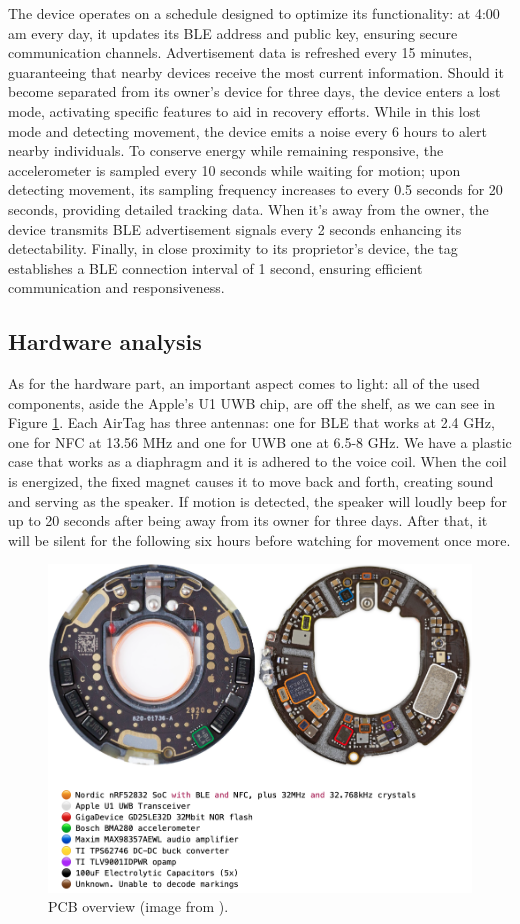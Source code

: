 \documentclass[english]{article}
\begin{document}
The device operates on a schedule designed to optimize its functionality:
at 4:00 am every day, it updates its BLE address and public key, ensuring secure communication channels.
Advertisement data is refreshed every 15 minutes, guaranteeing that nearby devices receive the most current information.
Should it become separated from its owner's device for three days, the device enters a lost mode, activating specific features to aid in recovery efforts.
While in this lost mode and detecting movement, the device emits a noise every 6 hours to alert nearby individuals.
To conserve energy while remaining responsive, the accelerometer is sampled every 10 seconds while waiting for motion; upon detecting movement, its sampling frequency increases to every 0.5 seconds for 20 seconds, providing detailed tracking data.
When it's away from the owner, the device transmits BLE advertisement signals every 2 seconds enhancing its detectability.
Finally, in close proximity to its proprietor's device, the tag establishes a BLE connection interval of 1 second, ensuring efficient communication and responsiveness.
\subsection{Hardware analysis}\label{hw}
As for the hardware part, an important aspect comes to light: all of the used components, aside the Apple's U1 UWB chip, are off the shelf, as we can see in Figure \ref{img:pcb}.
Each AirTag has three antennas: one for BLE that works at 2.4 GHz, one for NFC at 13.56 MHz and one for UWB one at 6.5-8 GHz.
We have a plastic case that works as a diaphragm and it is adhered to the voice coil. When the coil is energized, the fixed magnet causes it to move back and forth, creating sound and serving as the speaker.
If motion is detected, the speaker will loudly beep for up to 20 seconds after being away from its owner for three days. After that, it will be silent for the following six hours before watching for movement once more.
\begin{figure}[ht]
	\centering
	\includegraphics[width=\textwidth]{images/pcb.png}
	\caption{PCB overview (image from \cite{reverse}). }
	\label{img:pcb}
\end{figure}
\end{document}
